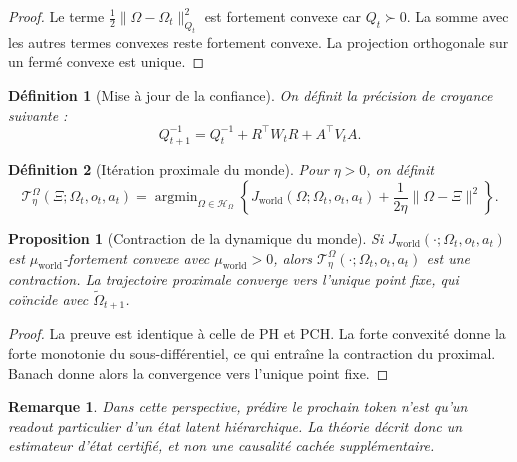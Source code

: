\documentclass[11pt,a4paper]{article}
\newtheorem{definition}{Définition}[section]
\newtheorem{proposition}{Proposition}[section]
\newtheorem{remark}{Remarque}[section]
\DeclareMathOperator{\argmin}{argmin}
\newcommand{\Hh}{\mathcal H}
\newcommand{\1}{\mathbf 1}
\begin{document}
\begin{proof}
Le terme \(\frac12\|\Omega-\Omega_t\|_{Q_t}^2\) est fortement convexe car \(Q_t\succ 0\).  
La somme avec les autres termes convexes reste fortement convexe.  
La projection orthogonale sur un fermé convexe est unique.
\end{proof}

\begin{definition}[Mise à jour de la confiance]
On définit la précision de croyance suivante :
\[
Q_{t+1}^{-1}
=
Q_t^{-1}
+
R^\top W_t R
+
A^\top V_t A.
\]
\end{definition}


\begin{definition}[Itération proximale du monde]
Pour \(\eta>0\), on définit
\[
\mathcal T^\Omega_\eta(\Xi;\Omega_t,o_t,a_t)
=
\argmin_{\Omega\in\Hh_\Omega}
\left\{
J_{\mathrm{world}}(\Omega;\Omega_t,o_t,a_t)
+
\frac{1}{2\eta}\|\Omega-\Xi\|^2
\right\}.
\]
\end{definition}

\begin{proposition}[Contraction de la dynamique du monde]
Si \(J_{\mathrm{world}}(\cdot;\Omega_t,o_t,a_t)\) est \(\mu_{\mathrm{world}}\)-fortement convexe avec \(\mu_{\mathrm{world}}>0\), alors \(\mathcal T^\Omega_\eta(\cdot;\Omega_t,o_t,a_t)\) est une contraction.  
La trajectoire proximale converge vers l'unique point fixe, qui coïncide avec \(\tilde\Omega_{t+1}\).
\end{proposition}

\begin{proof}
La preuve est identique à celle de PH et PCH.  
La forte convexité donne la forte monotonie du sous-différentiel, ce qui entraîne la contraction du proximal.  
Banach donne alors la convergence vers l'unique point fixe.
\end{proof}

\begin{remark}
Dans cette perspective, prédire le prochain token n'est qu'un readout particulier d'un état latent hiérarchique.  
La théorie décrit donc un estimateur d'état certifié, et non une causalité cachée supplémentaire.
\end{remark}
\end{document}
